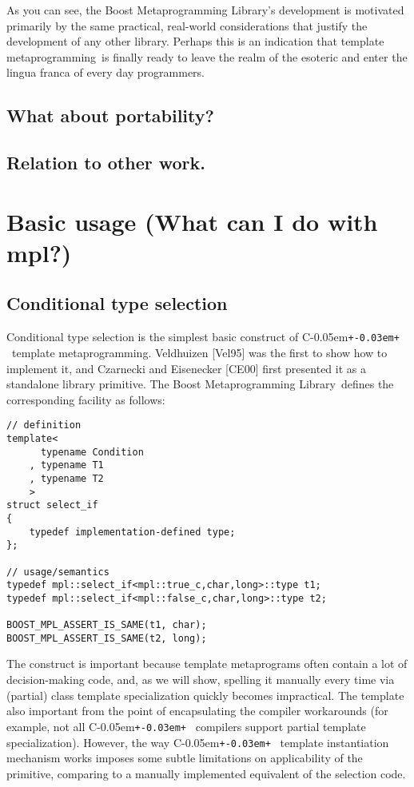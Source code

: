 \documentclass{netobjectdays}
\newcommand{\Cpp}{C\kern-0.05em\texttt{+\kern-0.03em+}%
}
\newcommand{\Mpl}{Boost Meta\-program\-ming Library}
\newcommand{\mping}{meta\-program\-ming}
\newcommand{\mpgms}{meta\-programs}
\begin{document}
As you can see, the \Mpl's development is motivated primarily by the
same practical, real-world considerations that justify the development
of any other library. Perhaps this is an indication that template
\mping\ is finally ready to leave the realm of the esoteric and enter
the lingua franca of every day programmers.

\subsection{What about portability? }

\subsection{Relation to other work.}

\section{Basic usage (What can I do with mpl?)}

\subsection{Conditional type selection}

Conditional type selection is the simplest basic construct of \Cpp\
template \mping{}. Veldhuizen [Vel95] was the first to show 
how to implement it, and Czarnecki and Eisenecker [CE00] first 
presented it as a standalone library primitive. The \Mpl\ defines the 
corresponding facility as follows:


{\footnotesize
\begin{verbatim}
// definition
template<
      typename Condition
    , typename T1
    , typename T2
    >
struct select_if
{
    typedef implementation-defined type;
};

// usage/semantics
typedef mpl::select_if<mpl::true_c,char,long>::type t1;
typedef mpl::select_if<mpl::false_c,char,long>::type t2;

BOOST_MPL_ASSERT_IS_SAME(t1, char);
BOOST_MPL_ASSERT_IS_SAME(t2, long);
\end{verbatim}
}

The construct is important because template \mpgms{} often 
contain a lot of decision-making code, and, as we will show, 
spelling it manually every time via (partial) class template 
specialization quickly becomes impractical. The template also 
important from the point of encapsulating the compiler 
workarounds (for example, not all \Cpp\ compilers support 
partial template specialization). However, the way \Cpp\ 
template instantiation mechanism works imposes some subtle 
limitations on applicability of the primitive, comparing to 
a manually implemented equivalent of the selection code. 
\end{document}
